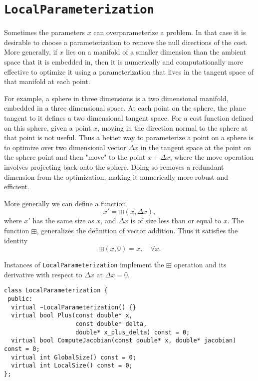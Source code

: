 \section{\texttt{LocalParameterization}}
Sometimes the parameters $x$ can overparameterize a problem. In
that case it is desirable to choose a parameterization to remove
the null directions of the cost. More generally, if $x$ lies on a
manifold of a smaller dimension than the ambient space that it is
embedded in, then it is numerically and computationally more
effective to optimize it using a parameterization that lives in
the tangent space of that manifold at each point.

For example, a sphere in three dimensions is a two dimensional
manifold, embedded in a three dimensional space. At each point on
the sphere, the plane tangent to it defines a two dimensional
tangent space. For a cost function defined on this sphere, given a
point $x$, moving in the direction normal to the sphere at that
point is not useful. Thus a better way to parameterize a point on
a sphere is to optimize over two dimensional vector $\Delta x$ in the
tangent space at the point on the sphere point and then "move" to
the point $x + \Delta x$, where the move operation involves projecting
back onto the sphere. Doing so removes a redundant dimension from
the optimization, making it numerically more robust and efficient.

More generally we can define a function
\begin{equation}
  x' = \boxplus(x, \Delta x),
\end{equation}
where $x'$ has the same size as $x$, and $\Delta x$ is of size less
than or equal to $x$. The function $\boxplus$, generalizes the
definition of vector addition. Thus it satisfies the identity
\begin{equation}
  \boxplus(x, 0) = x,\quad \forall x.
\end{equation}

Instances of \texttt{LocalParameterization} implement the $\boxplus$ operation and its derivative with respect to $\Delta x$ at $\Delta x = 0$.

\begin{verbatim}
class LocalParameterization {
 public:
  virtual ~LocalParameterization() {}
  virtual bool Plus(const double* x,
                    const double* delta,
                    double* x_plus_delta) const = 0;
  virtual bool ComputeJacobian(const double* x, double* jacobian) const = 0;
  virtual int GlobalSize() const = 0;
  virtual int LocalSize() const = 0;
};
\end{verbatim}

